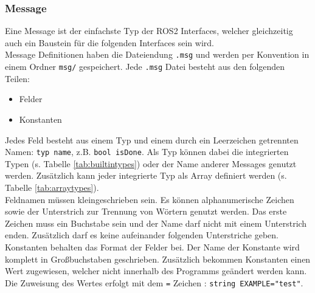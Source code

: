 \subsubsection{Message}
Eine Message ist der einfachste Typ der \ac{ROS2} Interfaces, welcher gleichzeitig auch ein Baustein für die folgenden Interfaces sein wird.\\
Message Definitionen haben die Dateiendung \verb|.msg| und werden per Konvention in einem Ordner \verb|msg/| gespeichert. Jede \verb|.msg| Datei besteht aus den folgenden Teilen:
\begin{itemize}
\item Felder
\item Konstanten
\end{itemize}
Jedes Feld besteht aus einem Typ und einem durch ein Leerzeichen getrennten Namen: \verb|typ name|, z.B. \verb|bool isDone|. Als Typ können dabei die integrierten Typen (s. Tabelle \ref{tab:builtintypes}) oder der Name anderer Messages genutzt werden. Zusätzlich kann jeder integrierte Typ als Array definiert werden (s. Tabelle \ref{tab:arraytypes}).\\
Feldnamen müssen kleingeschrieben sein. Es können alphanumerische Zeichen sowie der Unterstrich zur Trennung von Wörtern genutzt werden. Das erste Zeichen muss ein Buchstabe sein und der Name darf nicht mit einem Unterstrich enden. Zusätzlich darf es keine aufeinander folgenden Unterstriche geben.\\
Konstanten behalten das Format der Felder bei. Der Name der Konstante wird komplett in Großbuchstaben geschrieben. Zusätzlich bekommen Konstanten einen Wert zugewiesen, welcher nicht innerhalb des Programms geändert werden kann. Die Zuweisung des Wertes erfolgt mit dem \verb|=| Zeichen : \verb|string EXAMPLE="test"|.

